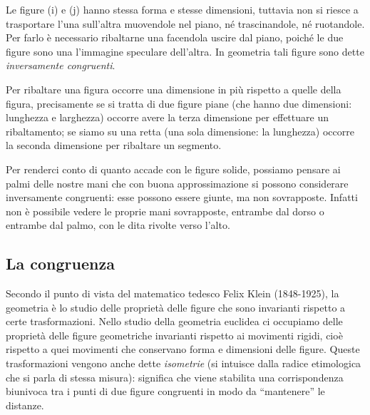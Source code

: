 \begin{minipage}{.49 \textwidth}
\begin{inaccessibleblock}
\begin{center}
\scalebox{.8}{}
\end{center}
\label{fig:figure_i_j}
\end{inaccessibleblock}
\end{minipage}
\hfil
\begin{minipage}{.49 \textwidth}
Le figure (i) e (j) hanno stessa forma e stesse dimensioni, tuttavia 
non si riesce a trasportare l'una sull'altra muovendole nel piano, né 
trascinandole, né ruotandole. Per farlo è necessario ribaltarne una 
facendola uscire dal piano, poiché le due figure sono una l'immagine 
speculare dell'altra. In geometria tali figure sono dette 
\emph{inversamente congruenti}.
\end{minipage}

\osservazione Per ribaltare una figura occorre una dimensione in più 
rispetto a quelle della figura, precisamente se si tratta di due 
figure piane (che hanno due dimensioni: lunghezza e larghezza)  
occorre avere la terza dimensione per effettuare un ribaltamento; se 
siamo su una retta (una sola dimensione: la lunghezza) occorre la 
seconda dimensione per ribaltare un segmento.

Per renderci conto di quanto accade con le figure solide, possiamo 
pensare ai palmi delle nostre mani che con buona approssimazione si 
possono considerare inversamente congruenti: esse possono essere 
giunte, ma non sovrapposte. Infatti non è possibile vedere le proprie 
mani sovrapposte, entrambe dal dorso o entrambe dal palmo, con le 
dita rivolte verso l'alto.

\subsection{La congruenza}

Secondo il punto di vista del matematico tedesco Felix Klein 
(1848-1925), la geometria è lo studio delle proprietà delle figure 
che sono invarianti rispetto a certe trasformazioni. Nello studio 
della geometria euclidea ci occupiamo delle proprietà delle figure 
geometriche 
invarianti 
rispetto ai movimenti rigidi, cioè rispetto a quei movimenti che 
conservano forma e dimensioni delle figure. Queste trasformazioni 
vengono anche dette \emph{isometrie} (si intuisce dalla radice 
etimologica che si parla di stessa misura): significa che viene 
stabilita una corrispondenza biunivoca tra i punti di due figure 
congruenti in modo da ``mantenere'' le distanze.

